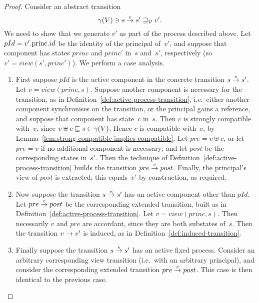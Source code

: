\begin{proof} 
Consider an abstract transition
\[
\gamma(V) \ni s \stackrel{e}\rightarrow s' \sqsupseteq_{\mathcal{V}} v'.
\]
We need to show that we generate $v'$ as part of the process described above.
Let $pId = v'.\mathrm{princ}.id$ be the identity of the principal of~$v'$, and suppose
that component has states $princ$ and $princ'$ in~$s$ and~$s'$, respectively
(so $v' = view(s', princ')$).  We perform a case analysis.
%
\begin{enumerate}
\item
First suppose $pId$ is the active component in the concrete transition
\( {s \stackrel{e}\rightarrow s'} \).
Let $v = view(princ, s)$.  
%
Suppose another component is necessary for the transition, as in
Definition~\ref{def:active-process-transition}, i.e.~either another component
synchronises on the transition, or the principal gains a reference, and
suppose that component has state~$c$ in~$s$.  Then $c$ is strongly compatible
with~$v$, since $v \uplus c \sqsubseteq s \in \gamma(V)$.  Hence $c$ is compatible
with~$v$, by Lemma~\ref{lem:strong-compatible-implies-compatible}.
%
Let $pre = v \uplus c$, or let $pre = v$ if no additional component is
necessary; and let $post$ be the corresponding states in~$s'$.  Then the
technique of Definition~\ref{def:active-process-transition} builds the
transition \( pre \stackrel{e}\rightarrow post \).  Finally, the principal's view of $post$
is extracted; this equals~$v'$ by construction, as required. 


\item
Now suppose the transition $s \stackrel{e}\rightarrow s'$ has an active component other than
$pId$.  Let $pre \stackrel{e}\rightarrow post$ be the corresponding extended transition,
built as in Definition~\ref{def:active-process-transition}.  Let $v =
view(princ, s)$.  Then necessarily $v$ and $pre$ are accordant, since they are
both substates of~$s$.  Then the transition $v \stackrel{}\rightarrow v'$ is induced, as in
Definition~\ref{def:induced-transition}.

\item
Finally suppose the transition $s \stackrel{e}\rightarrow s'$ has an active fixed process.
Consider an arbitrary corresponding view transition (i.e.~with an arbitrary
principal), and consider the corresponding extended transition $pre \stackrel{e}\rightarrow
post$.  This case is then identical to the previous case.
\end{enumerate}
\end{proof}


